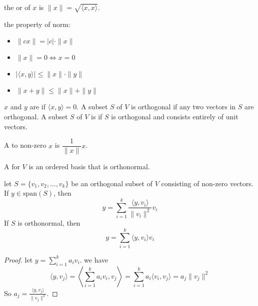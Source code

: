 \begin{definition}
	the  or  of $x$ is $ \|x\| = \sqrt{\langle x,x \rangle} $.
\end{definition}

\begin{theorem}
	the property of norm:
	\begin{itemize}
		\item $\| cx \| = |c| \cdot \| x \|$
		\item $\|x\| = 0 \iff x = 0$
		\item $|\langle x,y \rangle | \leq \|x\| \cdot \|y\|$
		\item $\|x+y\| \leq \|x\| + \|y\| $
	\end{itemize}
\end{theorem}

\begin{definition}
	$x$ and $y$ are  if $\langle x,y\rangle = 0$. A subset $S$ of $V$ is orthogonal if any two vectors in $S$ are orthogonal. A subset $S$ of $V$ is  if $S$ is orthogonal and consists entirely of unit vectors.
\end{definition}

\begin{definition}
	A  to non-zero $x$ is $\dfrac{1}{\|x\|} x$.
\end{definition}

\begin{definition}
	A  for $V$ is an ordered basis that is orthonormal.
\end{definition}

\begin{theorem}
	let $S=\{ v_1, v_2, \dots, v_k \}$ be an orthogonal subset of $V$ consisting of non-zero vectors. If $y \in \text{span}(S)$, then
	\begin{equation}
		y = \sum_{i=1}^k \frac{\langle y, v_i \rangle}{\| v_i \|^2} v_i
	\end{equation}
	If $S$ is orthonormal, then
	\begin{equation}
		y = \sum_{i=1}^k \langle y, v_i \rangle v_i
	\end{equation}
\end{theorem}
\begin{proof}
	let $y = \sum\limits_{i=1}^k a_i v_i$. we have
	\begin{equation*}
		\langle y, v_j \rangle = \left \langle \sum_{i=1}^k a_i v_i, v_j \right \rangle = \sum_{i=1}^k a_i \langle v_i, v_j \rangle = a_j \| v_j \|^2
	\end{equation*}
	So $a_j = \frac{\langle y, v_j \rangle}{\|v_j\|^2}$.
	
	
\end{proof}

